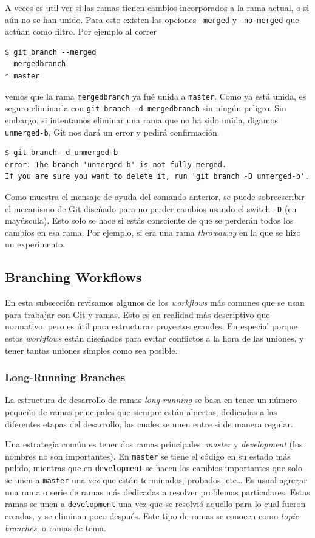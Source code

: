 \documentclass[spanish, 12pt, a4paper]{article}
\begin{document}
A veces es util ver si las ramas tienen cambios incorporados a la rama actual, o si aún no se han unido.
Para esto existen las opciones \texttt{--merged} y \texttt{--no-merged} que actúan como filtro.
Por ejemplo al correr
\begin{lstlisting}
$ git branch --merged
  mergedbranch 
* master
\end{lstlisting}
vemos que la rama \texttt{mergedbranch} ya fué unida a \texttt{master}.
Como ya está unida, es seguro eliminarla con \texttt{git branch -d mergedbranch} sin ningún peligro.
Sin embargo, si intentamos eliminar una rama que no ha sido unida, digamos \texttt{unmerged-b}, Git nos dará un error y pedirá confirmación.
\begin{lstlisting}
$ git branch -d unmerged-b
error: The branch 'unmerged-b' is not fully merged.
If you are sure you want to delete it, run 'git branch -D unmerged-b'.
\end{lstlisting}

Como muestra el mensaje de ayuda del comando anterior, se puede sobreescribir el mecanismo de Git diseñado para no perder cambios usando el switch \texttt{-D} (en mayúscula).
Esto solo se hace si estás consciente de que se perderán todos los cambios en esa rama.
Por ejemplo, si era una rama \textit{throwaway} en la que se hizo un experimento. 

\subsection{Branching Workflows}
En esta subsección revisamos algunos de los \textit{workflows} más comunes que se usan para trabajar con Git y ramas.
Esto es en realidad más descriptivo que normativo, pero es útil para estructurar proyectos grandes.
En especial porque estos \textit{workflows} están diseñados para evitar conflictos a la hora de las uniones, y tener tantas uniones simples como sea posible.

\subsubsection{Long-Running Branches}
La estructura de desarrollo de ramas \textit{long-running} se basa en tener un número pequeño de ramas principales que siempre están abiertas, dedicadas a las diferentes etapas del desarrollo, las cuales se unen entre si de manera regular.

Una estrategia común es tener dos ramas principales: \textit{master} y \textit{development} (los nombres no son importantes).
En \texttt{master} se tiene el código en su estado más pulido, mientras que en \texttt{development} se hacen los cambios importantes que solo se unen a \texttt{master} una vez que están terminados, probados, etc\dots
Es usual agregar una rama o serie de ramas más dedicadas a resolver problemas particulares.
Estas ramas se unen a \texttt{development} una vez que se resolvió aquello para lo cual fueron creadas, y se eliminan poco después.
Este tipo de ramas se conocen como \textit{topic branches}, o ramas de tema.
\end{document}
